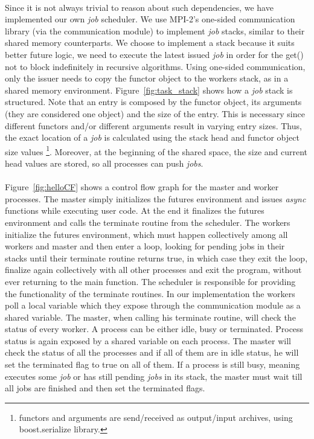 \paragraph{}
Since it is not always trivial to reason about such dependencies, we have implemented our own \emph{job} 
scheduler.  We use MPI-2's one-sided communication library (via the communication module) to implement \emph{job}
stacks, similar to their shared memory counterparts. We choose to implement a stack because it suits better
future logic, we need to execute the latest issued \emph{job} in order for the get() not to block indefinitely
in recursive algorithms.  Using one-sided communication, only the issuer needs to copy the functor object to
the workers stack, as in a shared memory environment.  Figure~\ref{fig:task_stack} 
shows how a \emph{job} stack is structured.  
Note that an entry is composed by the functor object, its arguments (they are considered one object) and the 
size of the entry. This is necessary since different functors and/or different arguments result in 
varying entry sizes.
Thus, the exact location of a \emph{job} is calculated using the stack head and functor object size values 
\footnote{functors and arguments are send/received as output/input archives, using boost.serialize library.}.
Moreover, at the beginning of the shared space, the size and current head values are stored, so all processes
can push \emph{jobs}.

\paragraph{}
Figure~\ref{fig:helloCF} shows a control flow graph for the master and worker processes.  
The master simply initializes
the futures environment and issues \emph{async} functions while executing user code.  At the end it finalizes 
the futures environment and calls the terminate routine from the scheduler.  The workers initialize 
the futures environment, which must happen collectively among all workers and master and then enter a
loop, looking for pending jobs in their stacks until their terminate routine returns true, in which case
they exit the loop, finalize again collectively with all other processes and exit the program, without ever
returning to the main function.  The scheduler is responsible for providing the functionality of the terminate
routines.  In our implementation the workers poll a local variable which they expose through the communication
module as a shared variable.  The master, when calling his terminate routine, will check the status of every 
worker.  A process can be either idle, busy or terminated.  Process status is again exposed by a shared variable
on each process.  The master will check the status of all the processes and if all of them are in idle status, he
will set the terminated flag to true on all of them.  If a process is still busy, meaning executes some \emph{job}
or has still pending \emph{jobs} in its stack, the master must wait till all jobs are finished and then set the 
terminated flags.

